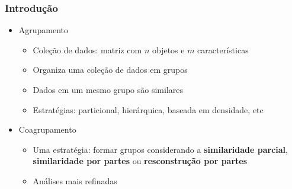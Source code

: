 \documentclass[10pt]{beamer}
\begin{document}
\begin{frame}
  \frametitle{Introdução}
  \begin{itemize}
    \item Agrupamento
    \begin{itemize}
      \item Coleção de dados: matriz com $n$ objetos e $m$ características
      \item Organiza uma coleção de dados em grupos
      \item Dados em um mesmo grupo são similares
      \item Estratégias: particional, hierárquica, baseada em densidade, etc
    \end{itemize}
    \item Coagrupamento
    \begin{itemize}
      \item Uma estratégia: formar grupos considerando a \textbf{similaridade parcial}, \textbf{similaridade por partes} ou \textbf{resconstrução por partes}
      \item Análises mais refinadas
    \end{itemize}
  \end{itemize}
\end{frame}

\end{document}
